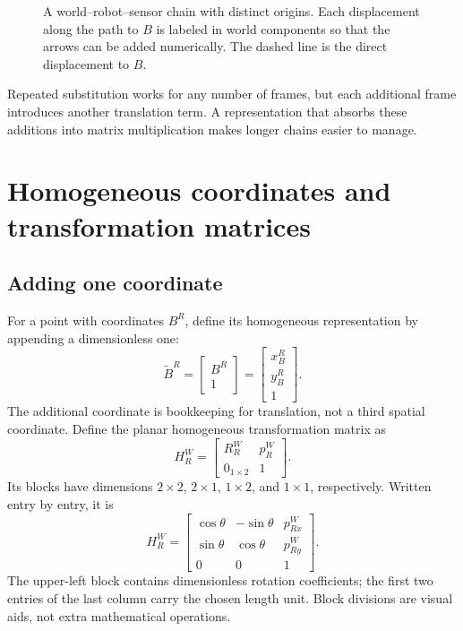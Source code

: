 \begin{figure}[htbp]
\centering
\caption{A world--robot--sensor chain with distinct origins. Each displacement
along the path to $B$ is labeled in world components so that the arrows can be
added numerically. The dashed line is the direct displacement to $B$.}
\label{fig:l03-composition}
\end{figure}

Repeated substitution works for any number of frames, but each additional
frame introduces another translation term. A representation that absorbs
these additions into matrix multiplication makes longer chains easier to manage.

\section{Homogeneous coordinates and transformation matrices}
\subsection{Adding one coordinate}
For a point with coordinates $B^R$, define its homogeneous representation by
appending a dimensionless one:
\begin{equation}
 \widetilde B^R=\begin{bmatrix}B^R\\1\end{bmatrix}
 =\begin{bmatrix}x_B^R\\y_B^R\\1\end{bmatrix}.
\end{equation}
The additional coordinate is bookkeeping for translation, not a third spatial
coordinate. Define the planar homogeneous transformation matrix as
\begin{equation}
 \boxed{H_R^W=\begin{bmatrix}R_R^W&p_R^W\\0_{1\times2}&1\end{bmatrix}.}
 \label{eq:l03-H}
\end{equation}
Its blocks have dimensions $2\times2$, $2\times1$, $1\times2$, and $1\times1$,
respectively. Written entry by entry, it is
\[
 H_R^W=\begin{bmatrix}
 \cos\theta&-\sin\theta&p_{Rx}^W\\
 \sin\theta&\cos\theta&p_{Ry}^W\\
 0&0&1
 \end{bmatrix}.
\]
The upper-left block contains dimensionless rotation coefficients; the first
two entries of the last column carry the chosen length unit. Block divisions
are visual aids, not extra mathematical operations.

